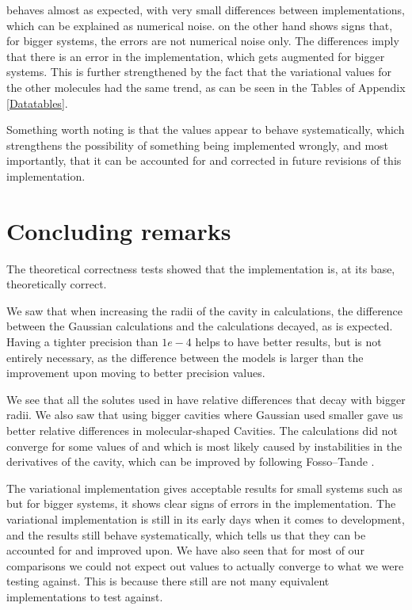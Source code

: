 \documentclass[../Thesis.tex]{subfiles}
\begin{document}
 behaves almost as expected, with very small differences between implementations,
which can be explained as numerical noise.  on the other hand shows signs that,
for bigger systems, the errors are not numerical noise only. The  differences imply
that there is an error in the implementation, which gets augmented for bigger systems.
This is further strengthened by the fact that the variational values for the other
molecules had the same trend, as can be seen in the Tables of Appendix \ref{Datatables}.

Something worth noting is that the values appear to behave systematically,
which strengthens the possibility of something being implemented wrongly, and most
importantly, that it can be accounted for and corrected in future revisions of
this implementation.

\section{Concluding remarks}
The theoretical correctness tests showed that the implementation is, at its base,
theoretically correct.

We saw that when increasing the radii of the cavity in calculations, the difference
between the Gaussian calculations and the \mrchem calculations decayed, as is
expected.
Having a tighter precision than $1e-4$ helps to have better results, but is not entirely
necessary, as the difference between the models is larger than the improvement upon
moving to better precision values.

We see that all the solutes used in \cite{Chipman2002} have relative differences that
decay with bigger radii. We also saw that using bigger \mrchem cavities where Gaussian
used smaller gave us better relative differences in molecular-shaped Cavities.
The \mrchem calculations did not converge for some values of  and 
which is most likely caused by instabilities in the derivatives of the cavity, which
can be improved by following Fosso--Tande \cite{FossoTande:2013ka}.

The variational implementation gives acceptable results for small systems such
as  but for bigger systems, it shows clear signs of errors in the implementation.
The variational implementation is still in its early days when it comes to development,
and the results still behave systematically, which tells us that they can be accounted for and
improved upon.
We have also seen that for most of our comparisons we could not expect out values to actually
converge to what we were testing against. This is because there still are not many
equivalent implementations to test against.
\end{document}

